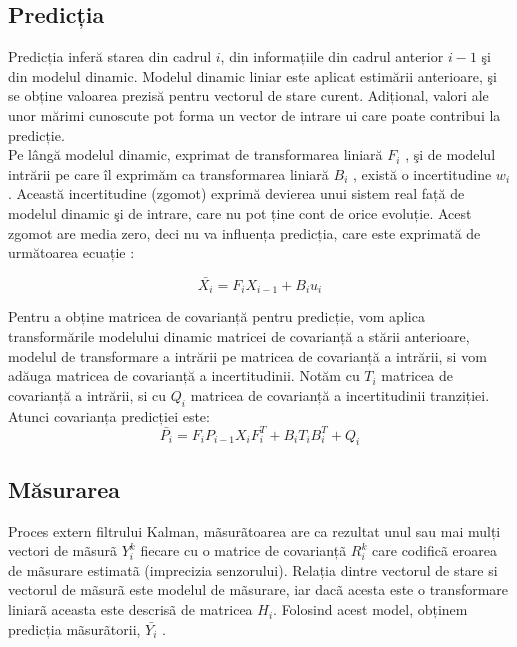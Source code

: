 \subsection{Predicția}
\-\hspace{1cm}Predicția inferă starea din cadrul $i$, din informațiile din cadrul anterior $i-1$ şi din modelul dinamic. Modelul dinamic liniar este aplicat estimării anterioare, şi se obține valoarea prezisă pentru vectorul de stare curent. Adițional, valori ale unor mărimi cunoscute pot forma un vector de intrare ui care poate contribui la predicție. \\
\-\hspace{1cm}Pe lângă modelul dinamic, exprimat de transformarea liniară $F_i$ , şi de modelul intrării pe care îl exprimăm ca transformarea liniară $B_i$ , există o incertitudine $w_i$. Această incertitudine (zgomot) exprimă devierea unui sistem real față de modelul dinamic şi de intrare, care nu pot ține cont de orice evoluție. Acest zgomot are media zero, deci nu va influența predicția, care este exprimată de următoarea ecuație \cite{Htrack}:

\begin{equation}
\bar{X_i}=F_iX_{i-1}+B_iu_i
\end{equation}

\-\hspace{1cm}Pentru a obține matricea de covarianță pentru predicție, vom aplica transformările modelului
dinamic matricei de covarianță a stării anterioare, modelul de transformare a intrării pe
matricea de covarianță a intrării, si vom adăuga matricea de covarianță a incertitudinii.
\-\hspace{1cm}Notăm cu $T_i$ matricea de covarianță a intrării, si cu $Q_i$ matricea de covarianță a incertitudinii
tranziției. Atunci covarianța predicției este:
\begin{equation}
\bar{P_i}=F_iP_{i-1}X_iF_i^T+B_iT_iB_i^T+Q_i
\end{equation}

\subsection{Măsurarea}
\-\hspace{1cm}Proces extern filtrului Kalman, mãsurãtoarea are ca rezultat unul sau mai mulți vectori de
mãsurã $Y_i^k$ fiecare cu o matrice de covarianțã $R_i^k$ care codificã eroarea de mãsurare estimatã
(imprecizia senzorului). Relația dintre vectorul de stare si vectorul de mãsurã este modelul de
mãsurare, iar dacã acesta este o transformare liniarã aceasta este descrisã de matricea $H_i$.
Folosind acest model, obținem predicția mãsurãtorii, $\bar{Y_i}$ \cite{kalman1}.

